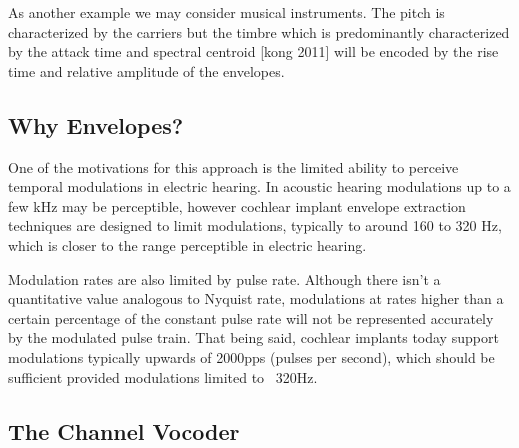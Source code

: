 \documentclass [11pt, proquest,oneside] {ganter_thesis}[2015/03/03]
\begin{document}
As another example we may consider musical instruments.  The pitch is characterized by the carriers but the timbre which is predominantly characterized by the attack time and spectral centroid [kong 2011] will be encoded by the rise time and relative amplitude of the envelopes.



\subsection{Why Envelopes?}

One of the motivations for this approach is the limited ability to perceive temporal modulations in electric hearing.  In acoustic hearing modulations up to a few kHz may be perceptible, however cochlear implant envelope extraction techniques are designed to limit modulations, typically to around 160 to 320 Hz, which is closer to the range perceptible in electric hearing.

Modulation rates are also limited by pulse rate.  Although there isn't a quantitative value analogous to Nyquist rate, modulations at rates higher than a certain percentage of the constant pulse rate will not be represented accurately by the modulated pulse train.  That being said, cochlear implants today support modulations typically upwards of 2000pps (pulses per second), which should be sufficient provided modulations limited to ~320Hz.

\subsection{The Channel Vocoder}
\end{document}
